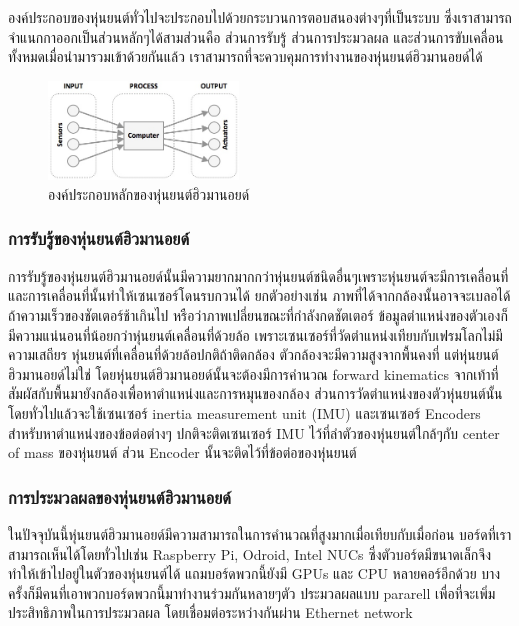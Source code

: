องค์ประกอบของหุ่นยนต์ทั่วไปจะประกอบไปด้วยกระบวนการตอบสนองต่างๆที่เป็นระบบ
ซึ่งเราสามารถจำแนกกาออกเป็นส่วนหลักๆได้สามส่วนคือ ส่วนการรับรู้ ส่วนการประมวลผล
และส่วนการขับเคลื่อน ทั้งหมดเมื่อนำมารวมเข้าด้วยกันแล้ว เราสามารถที่จะควบคุมการทำงานของหุ่นยนต์ฮิวมานอยด์ได้

\begin{figure}[htbp]
    \centering
    \includegraphics[width=0.45\textwidth]{chapter2/images/humanoid_combine.png}
	\caption{องค์ประกอบหลักของหุ่นยนต์ฮิวมานอยด์}
    \label{fig:humanoid_combine}
\end{figure}

\clearpage
\subsubsection*{การรับรู้ของหุ่นยนต์ฮิวมานอยด์}
การรับรู้ของหุ่นยนต์ฮิวมานอยด์นั้นมีความยากมากกว่าหุ่นยนต์ชนิดอื่นๆเพราะหุ่นยนต์จะมีการเคลื่อนที่ และการเคลื่อนที่นั้นทำให้เซนเซอร์โดนรบกวนได้
ยกตัวอย่างเช่น ภาพที่ได้จากกล้องนั้นอาจจะเบลอได้ถ้าความเร็วของชัตเตอร์ช้าเกินไป หรือว่าภาพเปลี่ยนขณะที่กำลังกดชัตเตอร์
ข้อมูลตำแหน่งของตัวเองก็มีความแน่นอนที่น้อยกว่าหุ่นยนต์เคลื่อนที่ด้วยล้อ เพราะเซนเซอร์ที่วัดตำแหน่งเทียบกับเฟรมโลกไม่มีความเสถียร
หุ่นยนต์ที่เคลื่อนที่ด้วยล้อปกติถ้าติดกล้อง ตัวกล้องจะมีความสูงจากพื้นคงที่ แต่หุ่นยนต์ฮิวมานอยด์ไม่ใช่ โดยหุ่นยนต์ฮิวมานอยด์นั้นจะต้องมีการคำนวณ
forward kinematics จากเท้าที่สัมผัสกับพื้นมายังกล้องเพื่อหาตำแหน่งและการหมุนของกล้อง ส่วนการวัดตำแหน่งของตัวหุ่นยนต์นั้น
โดยทั่วไปแล้วจะใช้เซนเซอร์ inertia measurement unit (IMU) และเซนเซอร์ Encoders สำหรับหาตำแหน่งของข้อต่อต่างๆ
ปกติจะติดเซนเซอร์ IMU ไว้ที่ลำตัวของหุ่นยนต์ใกล้ๆกับ center of mass ของหุ่นยนต์ ส่วน Encoder นั้นจะติดไว้ที่ข้อต่อของหุ่นยนต์

\subsubsection*{การประมวลผลของหุ่นยนต์ฮิวมานอยด์}
ในปัจจุบันนี้หุ่นยนต์ฮิวมานอยด์มีความสามารถในการคำนวณที่สูงมากเมื่อเทียบกับเมื่อก่อน บอร์ดที่เราสามารถเห็นได้โดยทั่วไปเช่น
Raspberry Pi, Odroid, Intel NUCs ซึ่งตัวบอร์ดมีขนาดเล็กจึงทำให้เข้าไปอยู่ในตัวของหุ่นยนต์ได้ แถมบอร์ดพวกนี้ยังมี GPUs
และ CPU หลายคอร์อีกด้วย บางครั้งก็มีคนที่เอาพวกบอร์ดพวกนี้มาทำงานร่วมกันหลายๆตัว ประมวลผลแบบ pararell เพื่อที่จะเพิ่มประสิทธิภาพในการประมวลผล
โดยเชื่อมต่อระหว่างกันผ่าน Ethernet network 

